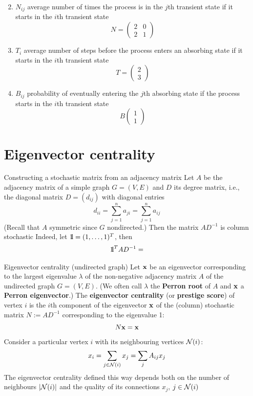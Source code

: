 \documentclass[aspectratio=169]{beamer}
\begin{document}
\begin{frame}
\begin{enumerate}
\setcounter{enumi}{1}
\item $N_{ij}$ average number of times the process is in the $j$th transient state if it starts in the $i$th transient state
\[
N=
\begin{pmatrix}
2 & 0 \\
2 & 1
\end{pmatrix}
\]
\vfill
\item $T_i$ average number of steps before the process enters an absorbing state if it starts in the $i$th transient state
\[
T=\begin{pmatrix}
2\\
3
\end{pmatrix}
\]
\vfill
\item $B_{ij}$ probability of eventually entering the $j$th absorbing state if the process starts in the $i$th transient state
\[
B
\begin{pmatrix}
1\\ 1
\end{pmatrix}
\]
\end{enumerate}
\vfill
\end{frame}


\section{Eigenvector centrality}

\begin{frame}{Constructing a stochastic matrix from an adjacency matrix}
	Let $A$ be the adjacency matrix of a simple graph $G=(V,E)$ and $D$ its degree matrix, i.e., the diagonal matrix $D=(d_{ij})$ with diagonal entries
	\[
		d_{ii} = \sum_{j=1}^n a_{ji} =\sum_{j=1}^n a_{ij}
	\]
	(Recall that $A$ symmetric since $G$ nondirected.)
	Then the matrix $AD^{-1}$ is column stochastic
	\vfill
	Indeed, let $\nbOne=(1,\ldots,1)^T$, then
	\begin{align*}
		\nbOne^TAD^{-1} = 
	\end{align*}
\end{frame}

\begin{frame}{Eigenvector centrality (undirected graph)}
Let $\mathbf{x}$ be an eigenvector corresponding to the largest eigenvalue $\lambda$ of the non-negative adjacency matrix $A$ of the undirected graph $G = (V, E)$. (We often call $\lambda$ the \textbf{Perron root} of $A$ and $\mathbf{x}$ a \textbf{Perron eigenvector}.)
\vfill
The \textbf{eigenvector centrality} (or \textbf{prestige score}) of vertex $i$ is the $i$th component of the eigenvector $\mathbf{x}$ of the (column) stochastic matrix $N := AD^{-1}$ corresponding to the eigenvalue 1:
\[
	N\mathbf{x} = \mathbf{x}
\]
\vfill
Consider a particular vertex $i$ with its neighbouring vertices $\mathcal{N}(i)$:
\[
	x_i = \sum_{j\in\mathcal{N}(i)} x_j 
	= \sum_j A_{ij} x_j	
\]
\vfill
The eigenvector centrality defined this way depends both on the number of neighbours $|\mathcal{N}(i)|$ and the quality of its connections $x_j$, $j\in\mathcal{N}(i)$
\end{frame}
\end{document}
